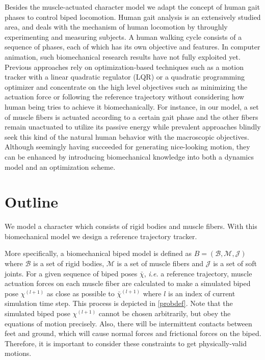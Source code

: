 \documentclass[master,english,final]{kaist-ucs}
\begin{document}
Besides the muscle-actuated character model we adapt the concept of
human gait phases to control biped locomotion. Human gait analysis is an extensively
studied area, and deals with the mechanism of human locomotion
by throughly experimenting and measuring subjects.
A human walking cycle consists of a sequence of phases, each of which has
its own objective and features.
In computer animation, such biomechanical research results have not fully exploited yet.
Previous approaches rely on optimization-based
techniques such as a motion tracker with a linear quadratic regulator (LQR)
or a quadratic programming optimizer and concentrate on the high level
objectives such as minimizing the actuation force or following the reference
trajectory without considering how human being tries
to achieve it biomechanically. For instance, in our model, a set of muscle fibers is
actuated according to a certain gait phase and the other fibers remain
unactuated to utilize its passive energy while prevalent approaches blindly seek
this kind of the natural human behavior with the macroscopic objectives.
Although seemingly having succeeded for generating nice-looking motion,
they can be enhanced by introducing biomechanical knowledge into both
a dynamics model and an optimization scheme.


\section{Outline}

We model a character which consists of rigid bodies and muscle fibers.
With this biomechanical model we design a reference trajectory tracker.

More specifically, a biomechanical biped model is defined as $B = (\mathcal{B}, \mathcal{M}, \mathcal {J})$ where
$\mathcal{B}$ is a set of rigid bodies, $\mathcal{M}$ is a set of muscle fibers and $\mathcal{J}$ is a set of
soft joints. For a given sequence of biped poses $\bar{\chi}$,
\emph{i.e.} a reference trajectory, muscle actuation forces on
each muscle fiber are calculated to make a simulated biped pose
$\chi^{(l+1)}$ as close as possible to
$\bar{\chi}^{(l+1)}$ where $l$ is an index of current simulation time step.
This process is depicted in \ref{probdef}.
Note that the simulated biped pose $\chi^{(l+1)}$ cannot be chosen arbitrarily,
but obey the equations of motion precisely. Also, there will be intermittent contacts
between feet and ground, which will cause normal forces and frictional forces on
the biped. Therefore, it is important to consider these constraints to get physically-valid
motions.
\end{document}

